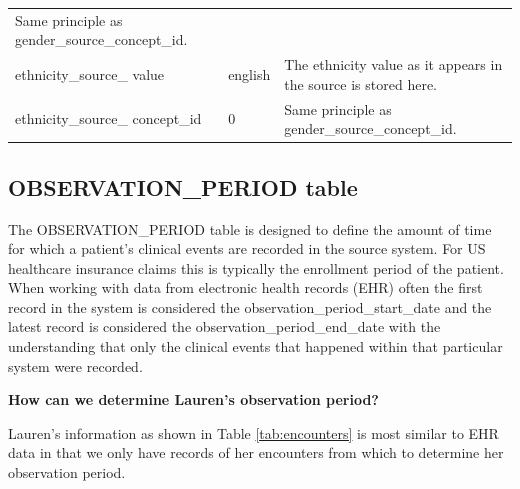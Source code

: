 \documentclass[11pt]{book}
\theoremstyle{definition}
\theoremstyle{definition}
\theoremstyle{definition}
\theoremstyle{remark}
\begin{document}
\begin{longtable}[]{@{}lll@{}}
\begin{minipage}[t]{0.49\columnwidth}
Same principle as gender\_source\_concept\_id.\strut
\end{minipage}\tabularnewline
\begin{minipage}[t]{0.28\columnwidth}\raggedright
ethnicity\_source\_ value\strut
\end{minipage} & \begin{minipage}[t]{0.15\columnwidth}\raggedright
english\strut
\end{minipage} & \begin{minipage}[t]{0.49\columnwidth}\raggedright
The ethnicity value as it appears in the source is stored here.\strut
\end{minipage}\tabularnewline
\begin{minipage}[t]{0.28\columnwidth}\raggedright
ethnicity\_source\_ concept\_id\strut
\end{minipage} & \begin{minipage}[t]{0.15\columnwidth}\raggedright
0\strut
\end{minipage} & \begin{minipage}[t]{0.49\columnwidth}\raggedright
Same principle as gender\_source\_concept\_id.\strut
\end{minipage}\tabularnewline
\bottomrule
\end{longtable}

\hypertarget{observationPeriod}{%
\subsection{OBSERVATION\_PERIOD table}\label{observationPeriod}}

The OBSERVATION\_PERIOD table is designed to define the amount of time for which a patient's clinical events are recorded in the source system. For US healthcare insurance claims this is typically the enrollment period of the patient. When working with data from electronic health records (EHR) often the first record in the system is considered the observation\_period\_start\_date and the latest record is considered the observation\_period\_end\_date with the understanding that only the clinical events that happened within that particular system were recorded.

\textbf{How can we determine Lauren's observation period?}

Lauren's information as shown in Table \ref{tab:encounters} is most similar to EHR data in that we only have records of her encounters from which to determine her observation period.
\end{document}
